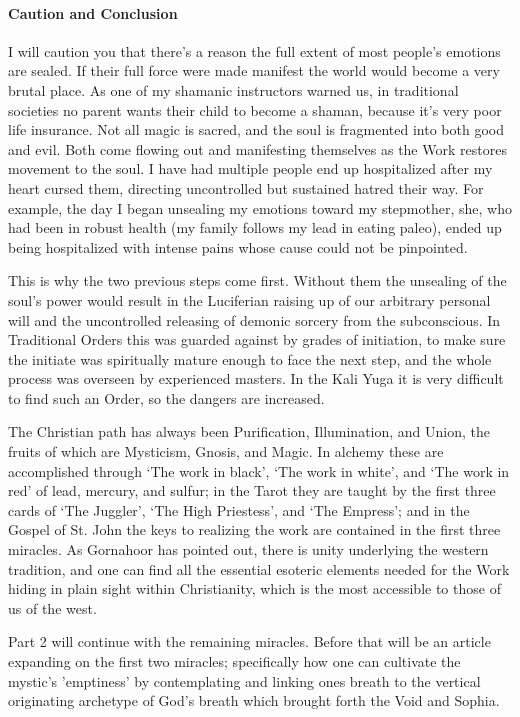 \paragraph{Caution and Conclusion}


I will caution you that there's a reason the full extent of most people's emotions are sealed. If their full force were made manifest the world would become a very brutal place. As one of my shamanic instructors warned us, in traditional societies no parent wants their child to become a shaman, because it's very poor life insurance. Not all magic is sacred, and the soul is fragmented into both good and evil. Both come flowing out and manifesting themselves as the Work restores movement to the soul. I have had multiple people end up hospitalized after my heart cursed them, directing uncontrolled but sustained hatred their way. For example, the day I began unsealing my emotions toward my stepmother, she, who had been in robust health (my family follows my lead in eating paleo), ended up being hospitalized with intense pains whose cause could not be pinpointed.

This is why the two previous steps come first. Without them the unsealing of the soul's power would result in the Luciferian raising up of our arbitrary personal will and the uncontrolled releasing of demonic sorcery from the subconscious. In Traditional Orders this was guarded against by grades of initiation, to make sure the initiate was spiritually mature enough to face the next step, and the whole process was overseen by experienced masters. In the Kali Yuga it is very difficult to find such an Order, so the dangers are increased.

The Christian path has always been Purification, Illumination, and Union, the fruits of which are Mysticism, Gnosis, and Magic. In alchemy these are accomplished through `The work in black', `The work in white', and `The work in red' of lead, mercury, and sulfur; in the Tarot they are taught by the first three cards of `The Juggler', `The High Priestess', and `The Empress'; and in the Gospel of St. John the keys to realizing the work are contained in the first three miracles. As Gornahoor has pointed out, there is unity underlying the western tradition, and one can find all the essential esoteric elements needed for the Work hiding in plain sight within Christianity, which is the most accessible to those of us of the west.

Part 2 will continue with the remaining miracles. Before that will be an article expanding on the first two miracles; specifically how one can cultivate the mystic's 'emptiness' by contemplating and linking ones breath to the vertical originating archetype of God's breath which brought forth the Void and Sophia.


